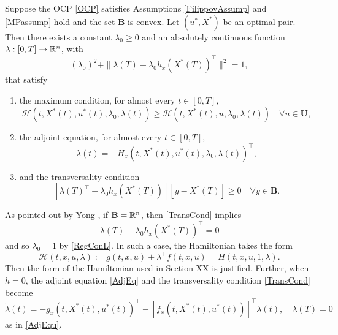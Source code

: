 \begin{theorem} Suppose the OCP \eqref{OCP} satisfies Assumptions \ref{FilippovAssump} and \ref{MPassump} hold and the set $\mathbf{B}$ is convex. Let $(u^\ast,X^\ast)$ be an optimal pair. Then there exists a constant $\lambda_0\geq 0$ and an absolutely continuous function $\lambda:[0,T]\to\mathbb{R}^n$, with
    \begin{equation}\label{RegConL}
        (\lambda_0)^2 + \|\lambda(T)-\lambda_0h_x(X^\ast(T))^\top\|^2 = 1,
    \end{equation}
that satisfy
\begin{enumerate}[\rm (a)]
    \item the maximum condition, for almost every $t\in[0,T]$, 
        \begin{equation}\label{MaxCond}
             \mathcal{H}(t,X^\ast(t),u^\ast(t),\lambda_0,\lambda(t)) \geq  
             \mathcal{H}(t,X^\ast(t),u,\lambda_0,\lambda(t)) \quad \forall u\in 
             \mathbf{U},
        \end{equation}
\item the adjoint equation, for almost every $t\in[0,T]$, 
      \begin{equation}\label{AdjEq}
          \dot{\lambda}(t) = -H_x(t,X^\ast(t),u^\ast(t),\lambda_0,\lambda(t))^\top,  
      \end{equation}
\item and the transversality condition
   \begin{equation}\label{TransCond}
    [\lambda(T)^\top-\lambda_0h_x(X^\ast(T))] [y-X^\ast(T)]\geq 0 \quad \forall y\in \mathbf{B}.
   \end{equation}
\end{enumerate}
\end{theorem}


\begin{remark}\label{RemNoCons}
As pointed out by Yong \cite[p. 43]{Yong2015}, if $\mathbf{B}=\mathbb{R}^n$, then \eqref{TransCond} implies 
  \[\lambda(T)-\lambda_0h_x(X^\ast(T))^\top=0\]
  and so $\lambda_0=1$ by \eqref{RegConL}. In such a case, the Hamiltonian takes the form  
      \[\mathcal{H}(t,x,u,\lambda):= g(t,x,u) + \lambda^\top f(t,x,u) = H(t,x,u,1,\lambda).  \]
      Then the form of the Hamiltonian used in Section XX is justified. Further, when $h=0$, the adjoint equation \eqref{AdjEq} and the transversality condition \eqref{TransCond} become 
    \[    \dot{\lambda}(t) = -g_x(t,X^\ast(t),u^\ast(t))^\top -  [f_x(t,X^\ast(t),u^\ast(t))]^\top \lambda(t), \quad \lambda(T)=0
  \]
  as in \eqref{AdjEqu}.
  \end{remark}
 


